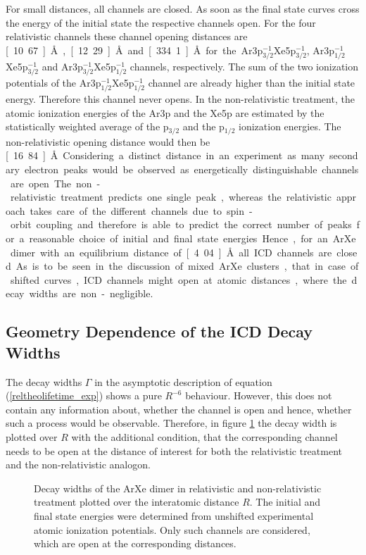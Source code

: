 For small distances, all channels are closed. As soon as the final
state curves cross the energy of the initial state
the respective channels open. For the four relativistic channels these
channel opening distances are
\unit[10.67]{\AA}, \unit[12.29]{\AA} and \unit[334.1]{\AA}
for the Ar3p$_{3/2}^{-1}$Xe5p$_{3/2}^{-1}$,
Ar3p$_{1/2}^{-1}$Xe5p$_{3/2}^{-1}$ and Ar3p$_{3/2}^{-1}$Xe5p$_{1/2}^{-1}$
channels, respectively.
The sum of the two ionization potentials of the
Ar3p$_{1/2}^{-1}$Xe5p$_{1/2}^{-1}$ channel are already higher than
the initial state energy. Therefore this channel never opens.
In the non-relativistic treatment, the atomic ionization energies of the
Ar3p and the Xe5p are estimated by the statistically weighted average of the
p$_{3/2}$ and the p$_{1/2}$ ionization energies. The non-relativistic
opening distance would then be
\unit[16.84]{\AA}.

Considering a distinct distance
in an experiment as many secondary electron peaks would be observed as
energetically distinguishable channels are open. The non-relativistic
treatment predicts one single peak, whereas the relativistic approach takes
care of the different channels due to spin-orbit coupling and therefore is
able to predict the correct number of peaks for a reasonable choice of initial
and final state energies.

Hence, for an ArXe dimer with an equilibrium distance of \unit[4.04]{\AA}
all ICD channels are closed. As is to be seen in the discussion of mixed
ArXe clusters, that in case of shifted curves, ICD channels might
open at atomic distances, where the decay widths are non-negligible.


\subsection{Geometry Dependence of the ICD Decay Widths}

The decay widths $\Gamma$ in the asymptotic description of equation
(\ref{reltheolifetime_exp}) shows a pure $R^{-6}$ behaviour.
However, this does not contain any information about, whether the channel is
open and hence, whether such a process would be observable. Therefore,
in figure \ref{figure:ArXe_gamma_unshifted} the decay width is plotted
over $R$ with the additional condition, that the corresponding channel needs
to be open at the distance of interest for both the relativistic treatment
and the non-relativistic analogon.

\begin{figure}[h]
  \centering
  
  \caption{Decay widths of the ArXe dimer in relativistic and non-relativistic
           treatment plotted over the interatomic
           distance $R$. The initial and final state energies were determined
           from unshifted experimental atomic ionization potentials. Only such
           channels are considered, which are open at the corresponding
           distances.}
  \label{figure:ArXe_gamma_unshifted}
\end{figure}

